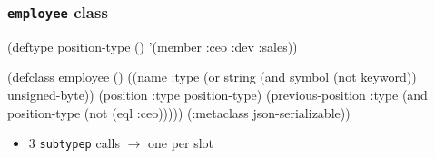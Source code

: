\documentclass[aspectratio=169]{beamer}
\renewcommand\code[1]{\texttt{#1}}
\newcommand\rarr{\ensuremath{\rightarrow}}
\begin{document}
\begin{frame}[fragile]
  \frametitle{\code{employee} class}
\begin{clcode}
(deftype position-type () '(member :ceo :dev :sales))

(defclass employee ()
  ((name :type (or string
                   (and symbol
                        (not keyword))
                   unsigned-byte))
   (position :type position-type)
   (previous-position :type (and position-type
                                 (not (eql :ceo)))))
  (:metaclass json-serializable))
\end{clcode}

  \pause
  \begin{itemize}
  \item 3 \code{subtypep} calls \rarr{} one per slot
  \end{itemize}
\end{frame}
\end{document}
